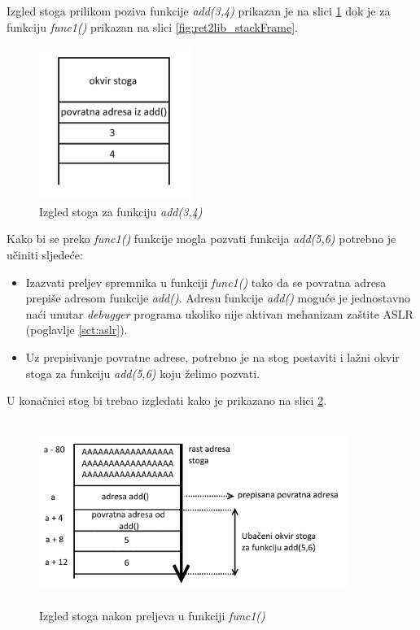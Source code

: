 \documentclass[times, utf8, diplomski, numeric]{fer}
\begin{document}
Izgled stoga prilikom poziva funkcije \emph{add(3,4)} prikazan je na slici \ref{fig:rop_add34} dok je za funkciju \emph{func1()} prikazan na slici \ref{fig:ret2lib_stackFrame}.

\begin{figure}[!htb]
\centering
\setlength\fboxsep{0pt}
\setlength\fboxrule{0.5pt}
\includegraphics[width=5cm, height=5cm]{slike/rop_add34}
\caption{Izgled stoga za funkciju \emph{add(3,4)}}
\label{fig:rop_add34} 
\end{figure}
Kako bi se preko \emph{func1()} funkcije mogla pozvati funkcija \emph{add(5,6)} potrebno je učiniti sljedeće:
\begin{itemize}
\item Izazvati preljev spremnika u funkciji \emph{func1()} tako da se povratna adresa prepiše adresom funkcije \emph{add()}. Adresu funkcije \emph{add()} moguće je jednostavno naći unutar \emph{debugger} programa ukoliko nije aktivan mehanizam zaštite ASLR (poglavlje \ref{sct:aslr}).
\item Uz prepisivanje povratne adrese, potrebno je na stog postaviti i lažni okvir stoga za funkciju \emph{add(5,6)} koju želimo pozvati.
\end{itemize}

U konačnici stog bi trebao izgledati kako je prikazano na slici \ref{fig:rop_add56}.

\begin{figure}[!htb]
\centering
\setlength\fboxsep{0pt}
\setlength\fboxrule{0.5pt}
\includegraphics[width=10cm, height=6cm]{slike/rop_add56}
\caption{Izgled stoga nakon preljeva u funkciji \emph{func1()}}
\label{fig:rop_add56} 
\end{figure}
\end{document}
